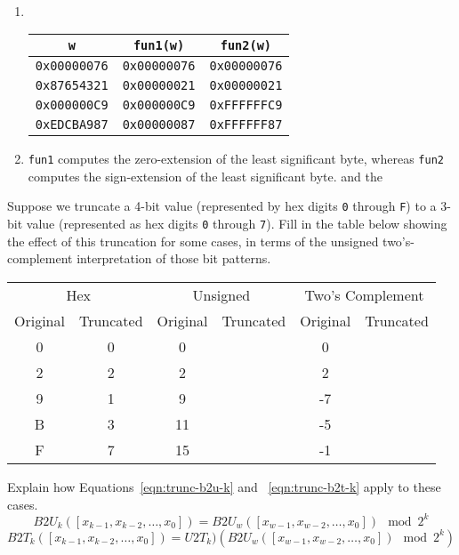\documentclass[12pt]{article}
\newenvironment{ex}[2][Exercise]{\begin{trivlist}
		\item[\hskip \labelsep {\bfseries #1}\hskip \labelsep {\bfseries #2.}]}{\end{trivlist}}
\newenvironment{sol}[1][Solution]{\begin{trivlist}
		\item[\hskip \labelsep {\bfseries #1:}]}{\end{trivlist}}
\begin{document}
\begin{sol}
	\
	\begin{enumerate}[label=(\alph*)]
		\item
		\
		\begin{center}
			\begin{tabular}{ccc}
				\texttt{w} & \texttt{fun1(w)} & \texttt{fun2(w)}\\
				\hline
				\texttt{0x00000076} & \texttt{0x00000076} & \texttt{0x00000076}\\
				\texttt{0x87654321} & \texttt{0x00000021} & \texttt{0x00000021}\\
				\texttt{0x000000C9} & \texttt{0x000000C9} & \texttt{0xFFFFFFC9}\\
				\texttt{0xEDCBA987} & \texttt{0x00000087} & \texttt{0xFFFFFF87}
			\end{tabular}
		\end{center}
		\item \texttt{fun1} computes the zero-extension of the least significant byte,
		whereas \texttt{fun2} computes the sign-extension of the least significant byte.
		and the 
	\end{enumerate}
\end{sol}

\begin{ex}{2.24}
	Suppose we truncate a 4-bit value (represented by hex digits \texttt{0} through
	\texttt{F}) to a 3-bit value (represented as hex digits \texttt{0} through \texttt{7}).
	Fill in the table below showing the effect of this truncation for some cases, in terms
	of the unsigned two's-complement interpretation of those bit patterns.
	\begin{center}
		\begin{tabular}{cccccc}
			\multicolumn{2}{c}{Hex} & \multicolumn{2}{c}{Unsigned} & \multicolumn{2}{c}{Two's Complement}\\
			Original & Truncated & Original & Truncated & Original & Truncated\\
			\hline
			0 & 0 & 0 & \makebox[1cm]{\hrulefill} & 0 & \makebox[1cm]{\hrulefill}\\
			2 & 2 & 2 & \makebox[1cm]{\hrulefill} & 2 & \makebox[1cm]{\hrulefill}\\
			9 & 1 & 9 & \makebox[1cm]{\hrulefill} & -7 & \makebox[1cm]{\hrulefill}\\
			B & 3 & 11 & \makebox[1cm]{\hrulefill} & -5 & \makebox[1cm]{\hrulefill}\\
			F & 7 & 15 & \makebox[1cm]{\hrulefill} & -1 & \makebox[1cm]{\hrulefill}
		\end{tabular}
	\end{center}
	Explain how Equations~\ref{eqn:trunc-b2u-k} and ~\ref{eqn:trunc-b2t-k} apply to these cases.
	\begin{equation}\label{eqn:trunc-b2u-k}
		B2U_k([x_{k-1}, x_{k-2},\ldots,x_0])=B2U_w([x_{w-1},x_{w-2},\ldots,x_0])\mod 2^k
	\end{equation}
	\begin{equation}\label{eqn:trunc-b2t-k}
		B2T_k([x_{k-1}, x_{k-2},\ldots,x_0])=U2T_k)(B2U_w([x_{w-1},x_{w-2},\ldots,x_0])\mod 2^k)
	\end{equation}
\end{ex}
\end{document}
